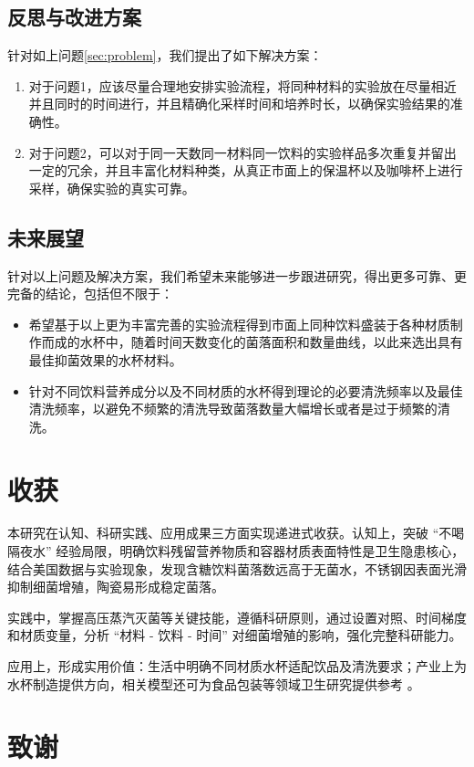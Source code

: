 \documentclass[12pt,a4paper]{ctexart}
\begin{document}
\subsection{反思与改进方案}
针对如上问题\ref{sec:problem}，我们提出了如下解决方案：
\begin{enumerate}
    \item 对于问题1，应该尽量合理地安排实验流程，将同种材料的实验放在尽量相近并且同时的时间进行，并且精确化采样时间和培养时长，以确保实验结果的准确性。
    \item 对于问题2，可以对于同一天数同一材料同一饮料的实验样品多次重复并留出一定的冗余，并且丰富化材料种类，从真正市面上的保温杯以及咖啡杯上进行采样，确保实验的真实可靠。
\end{enumerate}

\subsection{未来展望}
针对以上问题及解决方案，我们希望未来能够进一步跟进研究，得出更多可靠、更完备的结论，包括但不限于：
\begin{itemize}
    \item 希望基于以上更为丰富完善的实验流程得到市面上同种饮料盛装于各种材质制作而成的水杯中，随着时间天数变化的菌落面积和数量曲线，以此来选出具有最佳抑菌效果的水杯材料。
    \item 针对不同饮料营养成分以及不同材质的水杯得到理论的必要清洗频率以及最佳清洗频率，以避免不频繁的清洗导致菌落数量大幅增长或者是过于频繁的清洗。
\end{itemize}

\section{收获}
本研究在认知、科研实践、应用成果三方面实现递进式收获。认知上，突破 “不喝隔夜水” 经验局限，明确饮料残留营养物质和容器材质表面特性是卫生隐患核心，结合美国数据与实验现象，发现含糖饮料菌落数远高于无菌水，不锈钢因表面光滑抑制细菌增殖，陶瓷易形成稳定菌落。

实践中，掌握高压蒸汽灭菌等关键技能，遵循科研原则，通过设置对照、时间梯度和材质变量，分析 “材料 - 饮料 - 时间” 对细菌增殖的影响，强化完整科研能力。

应用上，形成实用价值：生活中明确不同材质水杯适配饮品及清洗要求；产业上为水杯制造提供方向，相关模型还可为食品包装等领域卫生研究提供参考 。

\clearpage
\thispagestyle{empty} 
\section{致谢} %
\end{document}
